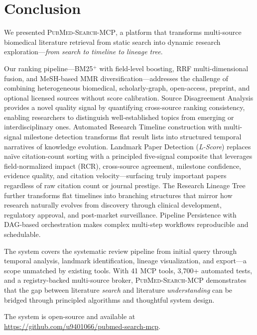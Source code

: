 \documentclass[11pt,a4paper]{article}
\newcommand{\system}{\textsc{PubMed-Search-MCP}}
\newcommand{\lscore}{\textit{L-Score}}
\begin{document}
\section{Conclusion}
\label{sec:conclusion}

We presented \system{}, a platform that transforms multi-source biomedical literature retrieval from static search into dynamic research exploration---\emph{from search to timeline to lineage tree}.

Our ranking pipeline---BM25$^{+}$ with field-level boosting, RRF multi-dimensional fusion, and MeSH-based MMR diversification---addresses the challenge of combining heterogeneous biomedical, scholarly-graph, open-access, preprint, and optional licensed sources without score calibration.
Source Disagreement Analysis provides a novel quality signal by quantifying cross-source ranking consistency, enabling researchers to distinguish well-established topics from emerging or interdisciplinary ones.
Automated Research Timeline construction with multi-signal milestone detection transforms flat result lists into structured temporal narratives of knowledge evolution.
Landmark Paper Detection (\lscore{}) replaces na\"ive citation-count sorting with a principled five-signal composite that leverages field-normalized impact (RCR), cross-source agreement, milestone confidence, evidence quality, and citation velocity---surfacing truly important papers regardless of raw citation count or journal prestige.
The Research Lineage Tree further transforms flat timelines into branching structures that mirror how research naturally evolves from discovery through clinical development, regulatory approval, and post-market surveillance.
Pipeline Persistence with DAG-based orchestration makes complex multi-step workflows reproducible and schedulable.

The system covers the systematic review pipeline from initial query through temporal analysis, landmark identification, lineage visualization, and export---a scope unmatched by existing tools.
With 41 MCP tools, 3{,}700+ automated tests, and a registry-backed multi-source broker, \system{} demonstrates that the gap between literature \emph{search} and literature \emph{understanding} can be bridged through principled algorithms and thoughtful system design.

The system is open-source and available at \url{https://github.com/u9401066/pubmed-search-mcp}.




\end{document}
